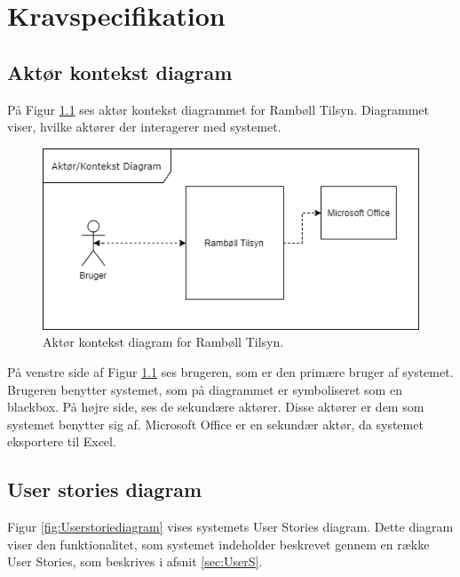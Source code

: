 	\chapter{Kravspecifikation}
	
	\section{Aktør kontekst diagram}
		På Figur \ref{fig:AktorKontekst} ses aktør kontekst diagrammet for Rambøll Tilsyn. Diagrammet viser, hvilke aktører der interagerer med systemet.
	\begin{figure}[H]
		\centering
		\includegraphics[width=0.6\linewidth]{Kravspecifikation/AktorDiagram}
		\caption{Aktør kontekst diagram for Rambøll Tilsyn.}
		\label{fig:AktorKontekst}
	\end{figure}

	På venstre side af Figur \ref{fig:AktorKontekst} ses brugeren, som er den primære bruger af systemet. Brugeren benytter systemet, som på diagrammet er symboliseret som en blackbox. På højre side, ses de sekundære aktører. Disse aktører er dem som systemet benytter sig af. Microsoft Office er en sekundær aktør, da systemet eksportere til Excel.
	
	\clearpage
	
\section{User stories diagram}
	Figur \ref{fig:Userstoriediagram} vises systemets User Stories diagram. Dette diagram viser den funktionalitet, som systemet indeholder beskrevet gennem en række User Stories, som beskrives i afsnit \ref{sec:UserS}.
	
